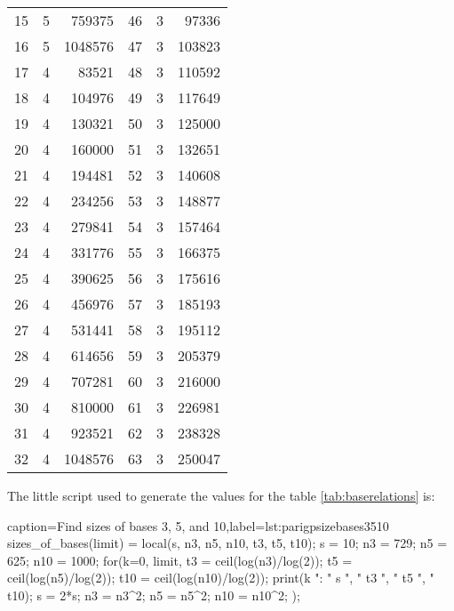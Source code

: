 \documentclass[a4paper,10pt]{article}
\theoremstyle{plain} %
\theoremstyle{definition}
\theoremstyle{remark}
\begin{document}
\begin{center}
\begin{longtable}{r r r | r r r}
15 & 5 & 759375  &   46 & 3 & 97336 \\
16 & 5 & 1048576  &  47 & 3 & 103823 \\
17 & 4 & 83521  &    48 & 3 & 110592 \\
18 & 4 & 104976  &   49 & 3 & 117649 \\
19 & 4 & 130321  &   50 & 3 & 125000 \\
20 & 4 & 160000  &   51 & 3 & 132651 \\
21 & 4 & 194481  &   52 & 3 & 140608 \\
22 & 4 & 234256  &   53 & 3 & 148877 \\
23 & 4 & 279841  &   54 & 3 & 157464 \\
24 & 4 & 331776  &   55 & 3 & 166375 \\
25 & 4 & 390625  &   56 & 3 & 175616 \\
26 & 4 & 456976  &   57 & 3 & 185193 \\
27 & 4 & 531441  &   58 & 3 & 195112 \\
28 & 4 & 614656  &   59 & 3 & 205379 \\
29 & 4 & 707281  &   60 & 3 & 216000 \\
30 & 4 & 810000  &   61 & 3 & 226981 \\
31 & 4 & 923521  &   62 & 3 & 238328 \\
32 & 4 & 1048576  &  63 & 3 & 250047
\end{longtable}
\label{tab:startvaluesn}
\end{center}

The little script used to generate the values for the table \ref{tab:baserelations} is:

\lstset{language=parigp}
\begin{pblisting}{caption={Find sizes of bases 3, 5, and 10},label=lst:parigpsizebases3510}
sizes_of_bases(limit) = {
   local(s, n3, n5, n10, t3, t5, t10);
   s = 10;
   n3 = 729;
   n5 = 625;
   n10 = 1000;
   for(k=0, limit,
      t3 = ceil(log(n3)/log(2));
      t5 = ceil(log(n5)/log(2));
      t10 = ceil(log(n10)/log(2));
      print(k ": " s ", " t3 ", " t5 ", " t10);
      s = 2*s;
      n3 = n3^2;
      n5 = n5^2;
      n10 = n10^2;
  );
}
\end{pblisting}
\end{document}
